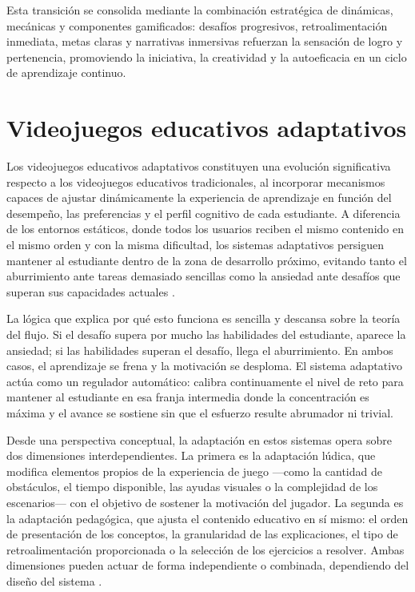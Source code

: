 Esta transición se consolida mediante la combinación estratégica de dinámicas, mecánicas y componentes gamificados: desafíos progresivos, retroalimentación inmediata, metas claras y narrativas inmersivas refuerzan la sensación de logro y pertenencia, promoviendo la iniciativa, la creatividad y la autoeficacia en un ciclo de aprendizaje continuo.


\section{Videojuegos educativos adaptativos}

Los videojuegos educativos adaptativos constituyen una evolución significativa
respecto a los videojuegos educativos tradicionales, al incorporar mecanismos
capaces de ajustar dinámicamente la experiencia de aprendizaje en función del
desempeño, las preferencias y el perfil cognitivo de cada estudiante. A diferencia
de los entornos estáticos, donde todos los usuarios reciben el mismo contenido
en el mismo orden y con la misma dificultad, los sistemas adaptativos persiguen
mantener al estudiante dentro de la zona de desarrollo próximo, evitando tanto
el aburrimiento ante tareas demasiado sencillas como la ansiedad ante desafíos
que superan sus capacidades actuales \cite{Csikszentmihalyi_2008, kiili_design_2012}.

La lógica que explica por qué esto funciona es sencilla y descansa sobre la teoría
del flujo. Si el desafío supera por mucho las habilidades del estudiante, aparece
la ansiedad; si las habilidades superan el desafío, llega el aburrimiento. En ambos
casos, el aprendizaje se frena y la motivación se desploma. El sistema adaptativo
actúa como un regulador automático: calibra continuamente el nivel de reto para
mantener al estudiante en esa franja intermedia donde la concentración es máxima
y el avance se sostiene sin que el esfuerzo resulte abrumador ni trivial.

Desde una perspectiva conceptual, la adaptación en estos sistemas opera sobre
dos dimensiones interdependientes. La primera es la adaptación lúdica,
que modifica elementos propios de la experiencia de juego —como la cantidad de
obstáculos, el tiempo disponible, las ayudas visuales o la complejidad de los
escenarios— con el objetivo de sostener la motivación del jugador. La segunda es
la adaptación pedagógica, que ajusta el contenido educativo en sí mismo:
el orden de presentación de los conceptos, la granularidad de las explicaciones,
el tipo de retroalimentación proporcionada o la selección de los ejercicios a
resolver. Ambas dimensiones pueden actuar de forma independiente o combinada,
dependiendo del diseño del sistema \cite{shum_personalised_2023, lindberg2017improving}.


